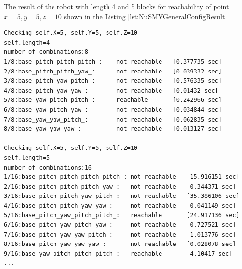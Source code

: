 The result of the robot with length 4 and 5 blocks for reachability of point 
 $x=5, y=5, z=10 $ shown in the Listing \ref{lst:NuSMVGeneralConfigResult}

\begin{lstlisting}[language=NuSMV, caption={The output of configuration model checking 
    for lengths of robot 4 and 5 and target region x=-5..5, y=-5..5, z=0..5}, 
    label={lst:NuSMVGeneralConfigResult}]
Checking self.X=5, self.Y=5, self.Z=10
self.length=4                                                                                            
number of combinations:8                                                                                 
1/8:base_pitch_pitch_pitch_:    not reachable   [0.377735 sec]        
2/8:base_pitch_pitch_yaw_:      not reachable   [0.039332 sec]        
3/8:base_pitch_yaw_pitch_:      not reachable   [0.576335 sec]                                           
4/8:base_pitch_yaw_yaw_:        not reachable   [0.01432 sec]                                            
5/8:base_yaw_pitch_pitch_:      reachable       [0.242966 sec]
6/8:base_yaw_pitch_yaw_:        not reachable   [0.034844 sec]
7/8:base_yaw_yaw_pitch_:        not reachable   [0.062835 sec]
8/8:base_yaw_yaw_yaw_:          not reachable   [0.013127 sec]            

Checking self.X=5, self.Y=5, self.Z=10
self.length=5                                                                                            
number of combinations:16                                                                                
1/16:base_pitch_pitch_pitch_pitch_: not reachable   [15.916151 sec]                                                                                                                                              
2/16:base_pitch_pitch_pitch_yaw_:   not reachable   [0.344371 sec]                                                                                                                                               
3/16:base_pitch_pitch_yaw_pitch_:   not reachable   [35.386106 sec]                                  
4/16:base_pitch_pitch_yaw_yaw_:     not reachable   [0.041149 sec]                                           
5/16:base_pitch_yaw_pitch_pitch_:   reachable       [24.917136 sec]                                  
6/16:base_pitch_yaw_pitch_yaw_:     not reachable   [0.727521 sec]        
7/16:base_pitch_yaw_yaw_pitch_:     not reachable   [1.013776 sec]         
8/16:base_pitch_yaw_yaw_yaw_:       not reachable   [0.028078 sec]
9/16:base_yaw_pitch_pitch_pitch_:   reachable       [4.10417 sec]                                    
...
\end{lstlisting}

